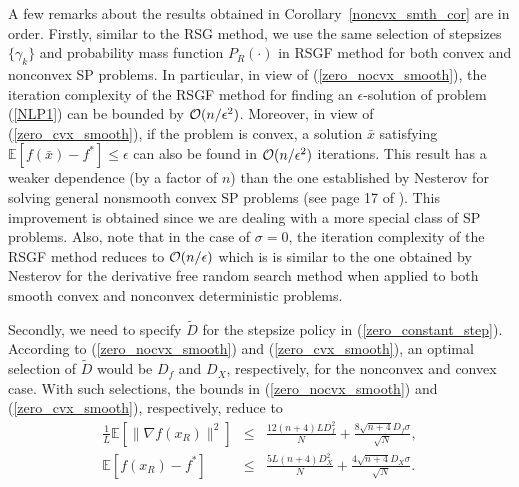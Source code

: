 \documentclass[final]{siamltex}
\newcommand{\beqa}{\begin{eqnarray}}
\newcommand{\eeqa}{\end{eqnarray}}
\def\eqnok#1{(\ref{#1})}
\def\vgap{\vspace*{.1in}}
\newcommand{\bbe}{\mathbb{E}}
\begin{document}
A few remarks about the results obtained in Corollary~\ref{noncvx_smth_cor} are in order.
Firstly, similar to the RSG method, we use the same selection of stepsizes
$\{\gamma_k\}$ and probability mass function $P_R(\cdot)$ in RSGF method for both convex and
nonconvex SP problems. In particular, in view of \eqnok{zero_nocvx_smooth}, the iteration complexity of
the RSGF method for finding an $\epsilon$-solution of problem \eqnok{NLP1} can be bounded by
${\cal O}(n/\epsilon^2)$.
Moreover, in view of \eqnok{zero_cvx_smooth}, if the problem is convex,
a solution $\bar x$ satisfying $\bbe[f(\bar x) - f^*] \le \epsilon$ can
also be found in ${\cal O}(n/\epsilon^2)$ iterations.
This result has a weaker dependence (by a factor of $n$) than the one established
by Nesterov for solving general nonsmooth convex SP problems (see page 17 of \cite{Nest11-1}).
This improvement is obtained since we are dealing with a more special class of
SP problems.
Also, note that in the case of $\sigma=0$, the iteration complexity of the RSGF method reduces to ${\cal O}(n/\epsilon)$ 
which is is similar to the one obtained by Nesterov \cite{Nest11-1} for the derivative free random search 
method when applied to both smooth convex and nonconvex deterministic problems.

Secondly, we need to specify $\tilde D$ for the stepsize policy in \eqnok{zero_constant_step}.
According to \eqnok{zero_nocvx_smooth} and \eqnok{zero_cvx_smooth}, an optimal selection of $\tilde D$
would be $ D_f$ and $D_X$, respectively, for the nonconvex and convex case.
With such selections, the bounds in \eqnok{zero_nocvx_smooth}
and \eqnok{zero_cvx_smooth}, respectively, reduce to
\beqa
 \frac{1}{L} \bbe[\|\nabla f(x_R)\|^2] &\le& \frac{12(n+4)L D_f^2}{N} + \frac{ 8 \sqrt{n+4} D_f \sigma}{\sqrt N}, \label{zero_nocvx_smooth1} \\
\bbe[f(x_R) - f^*] &\le&  \frac{5 L (n+4)D_X^2}{N} + \frac{4 \sqrt{n+4} D_X \sigma}{\sqrt N}. \label{zero_cvx_smooth1}
\eeqa

\vgap
\end{document}

